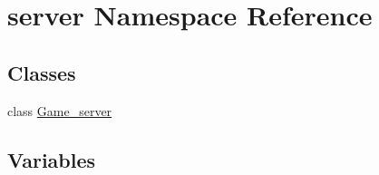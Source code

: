 \hypertarget{namespaceserver}{}\section{server Namespace Reference}
\label{namespaceserver}
\subsection*{Classes}
\begin{DoxyCompactItemize}
\item 
class \hyperlink{classserver_1_1_game__server}{Game\+\_\+server}
\end{DoxyCompactItemize}
\subsection*{Variables}
